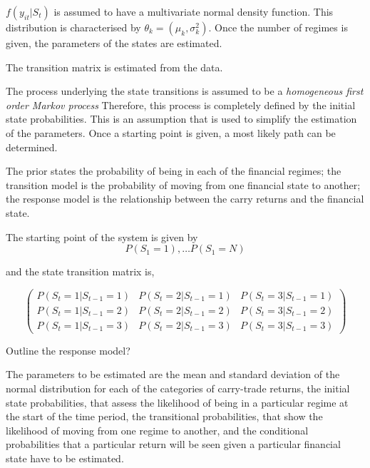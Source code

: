 \documentclass[12pt, a4paper, oneside]{article} %
\begin{document}
$f(y_{it}|S_t)$ is assumed to have a multivariate normal density function. This distribution is characterised by $\theta_k = (\mu_k, \sigma_k^2)$. Once the number of regimes is given, the parameters of the states are estimated.  

The transition matrix is estimated from the data. 

The process underlying the state transitions is assumed to be a \emph{homogeneous first order Markov process}  Therefore, this process is completely defined by the initial state probabilities. This is an assumption that is used to simplify the estimation of the parameters. Once a starting point is given, a most likely path can be determined. 

The prior states the probability of being in each of the financial regimes; the transition model is the probability of moving from one financial state to another; the response model is the relationship between the carry returns and the financial state.  

The starting point of the system is given by
\begin{equation*}
P(S_1 = 1), \dots P(S_1 = N)
\end{equation*}

and the state transition matrix is, 

\begin{equation*}
\begin{pmatrix}
P(S_t = 1|S_{t-1}=1) & P(S_t = 2|S_{t-1}=1) & P(S_t = 3|S_{t-1}=1)\\
P(S_t = 1|S_{t-1}=2) & P(S_t = 2|S_{t-1}=2) & P(S_t = 3|S_{t-1}=2)\\
P(S_t = 1|S_{t-1}=3) & P(S_t = 2|S_{t-1}=3) & P(S_t = 3|S_{t-1}=3)
\end{pmatrix}
\end{equation*}

Outline the response model?

The parameters to be estimated are the mean and standard deviation  of the normal distribution for each of the categories of carry-trade returns, the initial state probabilities, that assess the likelihood of being in a particular regime at the start of the time period, the transitional probabilities, that show the likelihood of moving from one regime to another, and the conditional probabilities that a particular return will be seen given a particular financial state have to be estimated.  
\end{document}
